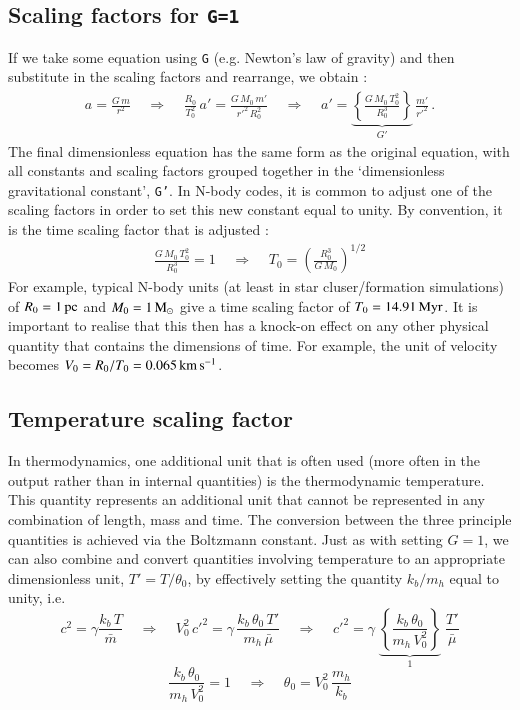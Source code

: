 \documentclass[a4paper]{article}
\newcommand{\var}[1]{\texttt{#1}}
\begin{document}
\subsection{Scaling factors for \var{G=1}}
If we take some equation using \var{G} (e.g. Newton's law of gravity) and then substitute in the scaling factors and rearrange, we obtain : 
\begin{eqnarray}
a = \frac{G\,m}{r^2} \;\;\;\; \Rightarrow \;\;\;\;
\frac{R_0}{T_0^2}\,a' = \frac{G\,M_0\,m'}{{r'}^2\,R_0^2} \;\;\;\; \Rightarrow \;\;\;\; a' = \underbrace{\left\{\frac{G\,M_0\,T_0^2}{R_0^3} \right\}}_{G'}\,\frac{m'}{{r'}^2}\,.
\end{eqnarray}
The final dimensionless equation has the same form as the original equation, with all constants and scaling factors grouped together in the `dimensionless gravitational constant', \var{G'}.  In N-body codes, it is common to adjust one of the scaling factors in order to set this new constant equal to unity.  By convention, it is the time scaling factor that is adjusted : 
\begin{eqnarray}
\frac{G\,M_0\,T_0^2}{R_0^3} = 1 \;\;\;\; \Rightarrow \;\;\;\;T_0 = \left( \frac{R_0^3}{G\,M_0} \right)^{1/2}
\end{eqnarray}
For example, typical N-body units (at least in star cluser/formation simulations) of $R_0 = 1\,{\rm pc}$ and $M_0 = 1\,{\rm M}_{\odot}$ give a time scaling factor of $T_0 = 14.91\,{\rm Myr}$.  It is important to realise that this then has a knock-on effect on any other physical quantity that contains the dimensions of time.  For example, the unit of velocity becomes $V_0 = R_0/T_0 = 0.065\,{\rm km\,s^{-1}}$.


\subsection{Temperature scaling factor}
In thermodynamics, one additional unit that is often used (more often in the output rather than in internal quantities) is the thermodynamic temperature.  This quantity represents an additional unit that cannot be represented in any combination of length, mass and time.  The conversion between the three principle quantities is achieved via the Boltzmann constant.  Just as with setting $G = 1$, we can also combine and convert quantities involving temperature to an appropriate dimensionless unit, $T' = T/\theta_0$, by effectively setting the quantity $k_b/m_h$ equal to unity, i.e.
\begin{equation}
c^2 = \gamma \frac{k_b\,T}{\bar{m}} \;\;\;\; \Rightarrow \;\;\;\;
V_0^2\,{c'}^2 = \gamma\,\frac{k_b\,\theta_0\,T'}{m_h\,\bar{\mu}}
\;\;\;\; \Rightarrow \;\;\;\;
{c'}^2 = \gamma \; \underbrace{ \left\{ \frac{k_b\,\theta_0}{m_h\, V_0^2} \right\} }_{1} \; \frac{T'}{\bar{\mu}}
\end{equation}
\begin{equation}
\frac{k_b\,\theta_0}{m_h\, V_0^2} = 1 \;\;\;\; \Rightarrow \;\;\;\; \theta_0 = V_0^2\,\frac{m_h}{k_b}
\end{equation}
\end{document}
